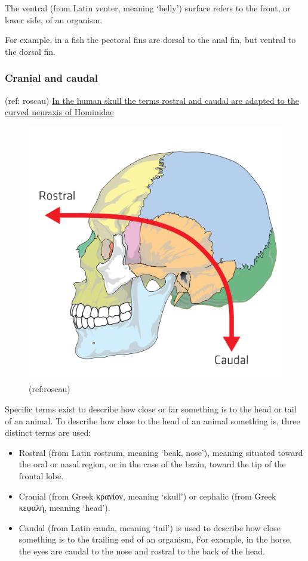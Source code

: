 The ventral (from Latin venter, meaning `belly') surface refers to the front, or lower side, of an organism.

For example, in a fish the pectoral fins are dorsal to the anal fin, but ventral to the dorsal fin.

\hypertarget{cranial-and-caudal}{%
\subsubsection{Cranial and caudal}\label{cranial-and-caudal}}

(ref: roscau) \href{https://commons.wikimedia.org/wiki/File:Rostralcaudal.svg}{In the human skull the terms rostral and caudal are adapted to the curved neuraxis of Hominidae}

\begin{figure}

{\centering \includegraphics[width=0.7\linewidth]{./figures/appendix/Rostralcaudal} 

}

\caption{(ref:roscau)}\label{fig:rostralcaudal}
\end{figure}

Specific terms exist to describe how close or far something is to the head or tail of an animal. To describe how close to the head of an animal something is, three distinct terms are used:

\begin{itemize}
\tightlist
\item
  Rostral (from Latin rostrum, meaning `beak, nose'), meaning situated toward the oral or nasal region, or in the case of the brain, toward the tip of the frontal lobe.
\item
  Cranial (from Greek κρανίον, meaning `skull') or cephalic (from Greek κεφαλή, meaning `head').
\item
  Caudal (from Latin cauda, meaning `tail') is used to describe how close something is to the trailing end of an organism,
  For example, in the horse, the eyes are caudal to the nose and rostral to the back of the head.
\end{itemize}


